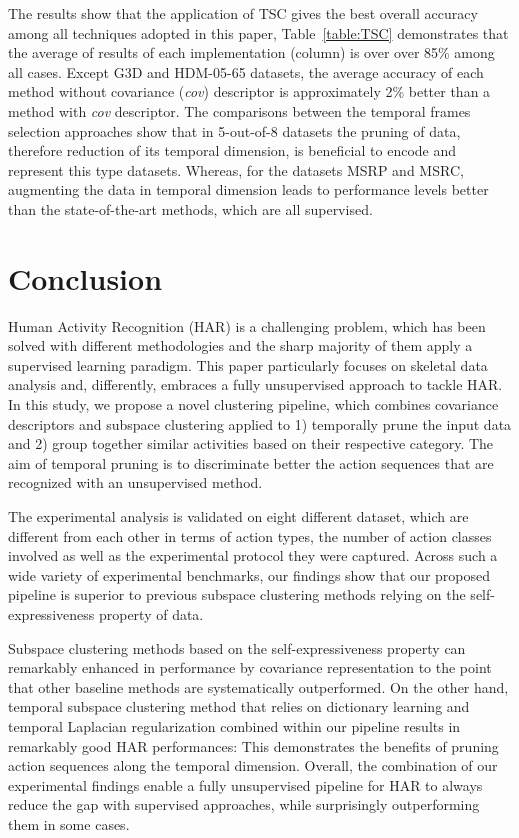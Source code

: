 \documentclass[10pt,a4paper,conference]{IEEEtran}
\begin{document}
The results show that the application of TSC gives the best overall accuracy among all techniques adopted in this paper, Table~\ref{table:TSC} demonstrates that the average of results of each implementation (column) is over over 85\% among all cases.
Except G3D and HDM-05-65 datasets, the average accuracy of each method without covariance (\emph{cov}) descriptor is approximately 2\% better than a method with \emph{cov} descriptor.
The comparisons between the temporal frames selection approaches show that in 5-out-of-8 datasets the pruning of data, therefore reduction of its temporal dimension, is beneficial to encode and represent this type datasets.
Whereas, for the datasets MSRP and MSRC, augmenting the data in temporal dimension leads to performance levels better than the state-of-the-art methods, which are all supervised.



\section{Conclusion}\label{sec:conclusion}

Human Activity Recognition (HAR) is a challenging problem, which has been solved with different methodologies and the sharp majority of them apply a supervised learning paradigm. This paper particularly focuses on skeletal data analysis and, differently, embraces a fully unsupervised approach to tackle HAR. In this study, we propose a novel clustering pipeline, which combines  covariance descriptors and subspace clustering applied to 1) temporally prune the input data and 2) group together similar activities based on their respective category. The aim of temporal pruning is to discriminate better the action sequences that are recognized with an unsupervised method.

The experimental analysis is validated on eight different dataset, which are different from each other in terms of action types, the number of action classes involved as well as the experimental protocol they were captured. Across such a wide variety of experimental benchmarks, our findings show that our proposed pipeline is superior to previous subspace clustering methods relying on the self-expressiveness property of data. 

Subspace clustering methods based on the self-expressiveness property can remarkably enhanced in performance by covariance representation to the point that other baseline methods are systematically outperformed.
On the other hand, temporal subspace clustering method that relies on dictionary learning and temporal Laplacian regularization combined within our pipeline results in remarkably good HAR performances: This demonstrates the benefits of pruning action sequences along the temporal dimension. Overall, the combination of our experimental findings enable a fully unsupervised pipeline for HAR to always reduce the gap with supervised approaches, while surprisingly outperforming them in some cases.






\end{document}
